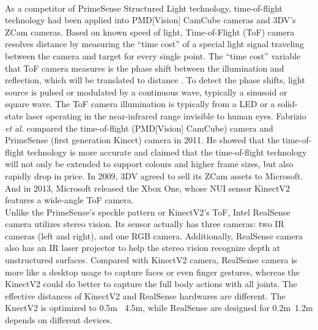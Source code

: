 \\\indent%
As a competitor of PrimeSense Structured Light technology, time-of-flight technology had been applied into PMD[Vision] CamCube cameras and 3DV's ZCam cameras. Based on known speed of light, Time-of-Flight (ToF) camera resolves distance by measuring the \enquote{time cost} of a special light signal traveling between the camera and target for every single point. The \enquote{time cost} variable that ToF camera measures is the phase shift between the illumination and reflection, which will be translated to distance \cite{TimeOfFlight}. To detect the phase shifts, light source is pulsed or modulated by a continuous wave, typically a sinusoid or square wave. The ToF camera illumination is typically from a LED or a solid-state laser operating in the near-infrared range invisible to human eyes. Fabrizio \textit{et al}.\cite{depthTechCompare_2011} compared the time-of-flight (PMD[Vision] CamCube) camera and PrimeSense (first generation Kinect) camera in 2011. He showed that the time-of-flight technology is more accurate and claimed that the time-of-flight technology will not only be extended to support colours and higher frame sizes, but also rapidly drop in price. In 2009, 3DV agreed to sell its ZCam assets to Microsoft. And in 2013,  Microsoft released the Xbox One, whose NUI sensor KinectV2 features a wide-angle ToF camera.
\\\indent
Unlike the PrimeSense's speckle pattern or KinectV2's ToF, Intel RealSense camera utilizes stereo vision. Its sensor actually has three cameras: two IR cameras (left and right), and one RGB camera. Additionally, RealSense camera also has an IR laser projector to help the stereo vision recognize depth at unstructured surfaces. Compared with KinectV2 camera, RealSense camera is more like a desktop usage to capture faces or even finger gestures, whereas the KinectV2 could do better to capture the full body actions with all joints. The effective distances of KinectV2 and RealSense hardwares are different. The KnectV2 is optimized to 0.5m ~4.5m, while RealSense are designed for 0.2m~1.2m depends on different devices.

